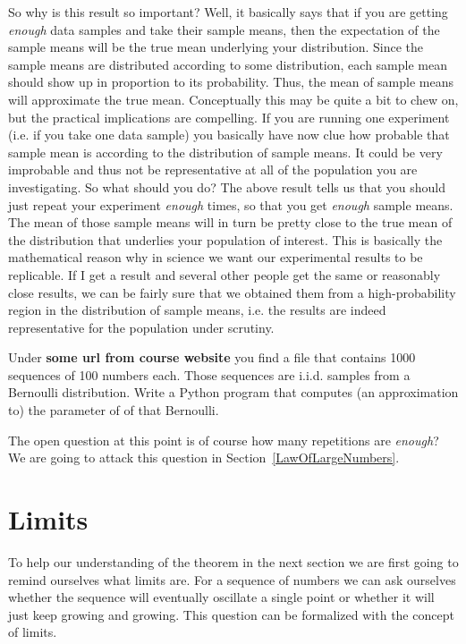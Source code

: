 So why is this result so important? Well, it basically says that if you are getting \textit{enough} data samples and take their sample means,
then the expectation of the sample means will be the true mean underlying your distribution. Since the sample means are distributed according
to some distribution, each sample mean should show up in proportion to its probability. Thus, the mean
of sample means will approximate the true mean. Conceptually this may be quite a bit to chew on, but the practical implications are compelling.
If you are running one experiment (i.e. if you take one data sample) you basically have now clue how probable that sample mean is according
to the distribution of sample means. It could be very improbable and thus not be representative at all of the population you are investigating.
So what should you do? The above result tells us that you should just repeat your experiment \textit{enough} times, so that you get
\textit{enough} sample means. The mean of those sample means will in turn be pretty close to the true mean of the distribution that underlies your population
of interest. This is basically the mathematical reason why in science we want our experimental results to be replicable. If I get a result
and several other people get the same or reasonably close results, we can be fairly sure that we obtained them from a high-probability region
in the distribution of sample means, i.e. the results are indeed representative for the population under scrutiny.

\begin{Exercise}
Under \textbf{some url from course website} you find a file that contains 1000 sequences of 100 numbers each. Those sequences are i.i.d.
samples from a Bernoulli distribution. Write a Python program that computes (an approximation to) the parameter of of that Bernoulli.
\end{Exercise}

The open question at this point is of course how many repetitions are \textit{enough}? We are going to attack this question in Section~\ref{LawOfLargeNumbers}.

\section{Limits}
To help our understanding of the theorem in the next section we are first going to remind ourselves what limits are. For a sequence of numbers
we can ask ourselves whether the sequence will eventually oscillate a single point or whether it will just keep growing and growing. This
question can be formalized with the concept of limits.

